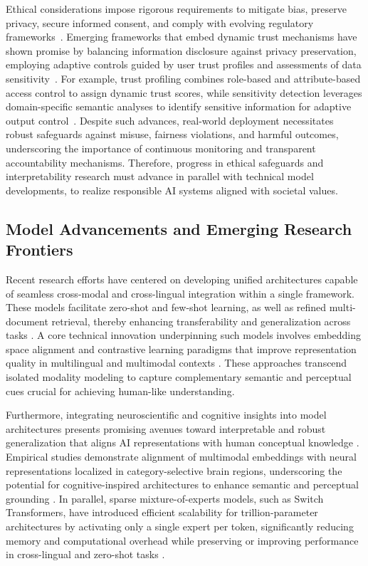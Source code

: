 \documentclass[sigconf]{acmart}
\begin{document}
Ethical considerations impose rigorous requirements to mitigate bias, preserve privacy, secure informed consent, and comply with evolving regulatory frameworks~\cite{ref11,ref12,ref13}. Emerging frameworks that embed dynamic trust mechanisms have shown promise by balancing information disclosure against privacy preservation, employing adaptive controls guided by user trust profiles and assessments of data sensitivity~\cite{ref34}. For example, trust profiling combines role-based and attribute-based access control to assign dynamic trust scores, while sensitivity detection leverages domain-specific semantic analyses to identify sensitive information for adaptive output control~\cite{ref11}. Despite such advances, real-world deployment necessitates robust safeguards against misuse, fairness violations, and harmful outcomes, underscoring the importance of continuous monitoring and transparent accountability mechanisms. Therefore, progress in ethical safeguards and interpretability research must advance in parallel with technical model developments, to realize responsible AI systems aligned with societal values.

\subsection{Model Advancements and Emerging Research Frontiers}

Recent research efforts have centered on developing unified architectures capable of seamless cross-modal and cross-lingual integration within a single framework. These models facilitate zero-shot and few-shot learning, as well as refined multi-document retrieval, thereby enhancing transferability and generalization across tasks \cite{ref2,ref4,ref5,ref14,ref28,ref29}. A core technical innovation underpinning such models involves embedding space alignment and contrastive learning paradigms that improve representation quality in multilingual and multimodal contexts \cite{ref2,ref4,ref5,ref31}. These approaches transcend isolated modality modeling to capture complementary semantic and perceptual cues crucial for achieving human-like understanding.

Furthermore, integrating neuroscientific and cognitive insights into model architectures presents promising avenues toward interpretable and robust generalization that aligns AI representations with human conceptual knowledge \cite{ref2,ref4,ref5,ref11,ref14}. Empirical studies demonstrate alignment of multimodal embeddings with neural representations localized in category-selective brain regions, underscoring the potential for cognitive-inspired architectures to enhance semantic and perceptual grounding \cite{ref2}. In parallel, sparse mixture-of-experts models, such as Switch Transformers, have introduced efficient scalability for trillion-parameter architectures by activating only a single expert per token, significantly reducing memory and computational overhead while preserving or improving performance in cross-lingual and zero-shot tasks \cite{ref14}. 
\end{document}
